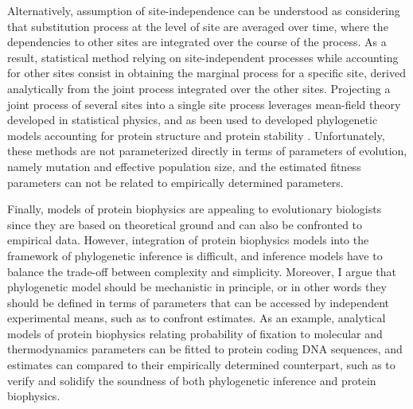 Alternatively, assumption of site-independence can be understood as considering that substitution process at the level of site are averaged over time, where the dependencies to other sites are integrated over the course of the process.
As a result, statistical method relying on site-independent processes while accounting for other sites consist in obtaining the marginal process for a specific site, derived analytically from the joint process integrated over the other sites.
Projecting a joint process of several sites into a single site process leverages mean-field theory developed in statistical physics, and as been used to developed phylogenetic models accounting for protein structure \citep{Chi2018} and protein stability \citep{Arenas2015a, Arenas2017}.
Unfortunately, these methods are not parameterized directly in terms of parameters of evolution, namely mutation and effective population size, and the estimated fitness parameters can not be related to empirically determined parameters. 

Finally, models of protein biophysics are appealing to evolutionary biologists since they are based on theoretical ground and can also be confronted to empirical data.
However, integration of protein biophysics models into the framework of phylogenetic inference is difficult, and inference models have to balance the trade-off between complexity and simplicity.
Moreover, I argue that phylogenetic model should be mechanistic in principle, or in other words they should be defined in terms of parameters that can be accessed by independent experimental means, such as to confront estimates.
As an example, analytical models of protein biophysics relating probability of fixation to molecular and thermodynamics parameters can be fitted to protein coding DNA sequences, and estimates can compared to their empirically determined counterpart, such as to verify and solidify the soundness of both phylogenetic inference and protein biophysics.